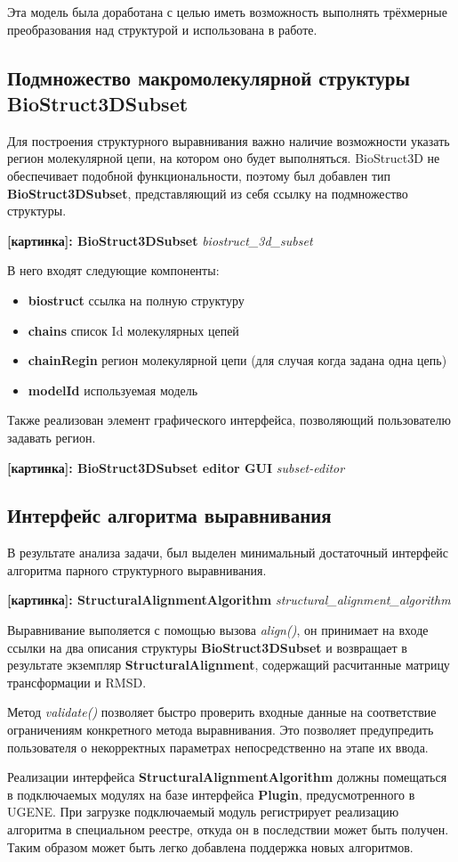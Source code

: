 \documentclass[a4paper, 12pt, titlepage, utf8]{extarticle}
\newcommand{\class}{\textbf}
\newcommand{\method}{\textit}
\newcommand{\myimage}[2]{   
    \begin{center} \textbf{[картинка]: #1} \textit{#2} \end{center} 
}
\begin{document}
Эта модель была доработана с целью иметь возможность выполнять трёхмерные преобразования над структурой и использована в работе.

\subsection{Подмножество макромолекулярной структуры BioStruct3DSubset}
Для построения структурного выравнивания важно наличие возможности указать регион молекулярной цепи, на котором оно будет выполняться. BioStruct3D не обеспечивает подобной функциональности, поэтому был добавлен тип \class{BioStruct3DSubset}, представляющий из себя ссылку на подмножество структуры.
\myimage{BioStruct3DSubset}{biostruct\_3d\_subset}

В него входят следующие компоненты:
\begin{itemize}
    \item \textbf{biostruct}  ссылка на полную структуру 
    \item \textbf{chains} список Id молекулярных цепей 
    \item \textbf{chainRegin} регион молекулярной цепи (для случая когда задана одна цепь)
    \item \textbf{modelId} используемая модель
\end{itemize}

Также реализован элемент графического интерфейса, позволяющий пользователю задавать регион.
\myimage{BioStruct3DSubset editor GUI}{subset-editor}

\subsection{Интерфейс алгоритма выравнивания}
В результате анализа задачи, был выделен минимальный достаточный интерфейс алгоритма парного структурного выравнивания. 

\myimage{StructuralAlignmentAlgorithm}{structural\_alignment\_algorithm}
Выравнивание выполяется с помощью вызова \method{align()}, он принимает на входе ссылки на два описания структуры \class{BioStruct3DSubset} и возвращает в результате экземпляр \class{StructuralAlignment}, содержащий расчитанные матрицу трансформации и RMSD. 

Метод \method{validate()} позволяет быстро проверить входные данные на соответствие ограничениям конкретного метода выравнивания. Это позволяет предупредить пользователя о некорректных параметрах непосредственно на этапе их ввода.

Реализации интерфейса \class{StructuralAlignmentAlgorithm} должны помещаться в подключаемых модулях на базе интерфейса \class{Plugin}, предусмотренного в UGENE. При загрузке подключаемый модуль регистрирует реализацию алгоритма в специальном реестре, откуда он в последствии может быть получен. Таким образом может быть легко добавлена поддержка новых алгоритмов.
\end{document}
